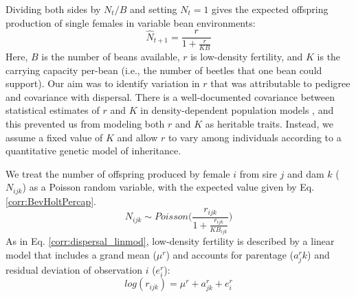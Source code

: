 \documentclass[11pt]{article}
\begin{document}
Dividing both sides by $N_{t}/B$ and setting $N_{t}=1$ gives the expected offspring production of single females in variable bean environments:
%
\begin{equation}\label{corr:BevHoltPercap}
  \hat{N}_{t+1} = \frac{r}{1 + \frac{r}{KB}}
\end{equation}
%
Here, $B$ is the number of beans available, $r$ is low-density fertility, and $K$ is the carrying capacity per-bean (i.e., the number of beetles that one bean could support).
Our aim was to identify variation in $r$ that was attributable to pedigree and covariance with dispersal.
There is a well-documented covariance between statistical estimates of $r$ and $K$ in density-dependent population models \citep{hilborn_quantitative_1992}, and this prevented us from modeling both $r$ and $K$ as heritable traits.
Instead, we assume a fixed value of $K$ and allow $r$ to vary among individuals according to a quantitative genetic model of inheritance.

We treat the number of offspring produced by female $i$ from sire $j$ and dam $k$ ($N_{ijk}$) as a Poisson random variable, with the expected value given by Eq. \ref{corr:BevHoltPercap}.
%
\begin{equation}\label{corr:Noff_ran}
  N_{ijk} \sim \mathit{Poisson}\Big(\frac{r_{ijk}} {1 + \frac{r_{ijk}}{KB_{ijk} }}\Big)
\end{equation}
%
As in Eq. \ref{corr:dispersal_linmod}, low-density fertility is described by a linear model that includes a grand mean ($\mu^{r}$) and accounts for parentage ($a^{r}_jk$) and residual deviation of observation $i$ ($e^{r}_i$):
%
\begin{equation} \label{corr:fert_linmod}
  log(r_{ijk}) = \mu^{r} + a^{r}_{jk} + e^{r}_{i}
\end{equation}
%
\end{document}
